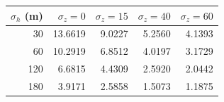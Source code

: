 \begin{tabular}{rrrrr}
\toprule
$\sigma_h$ (m) & $\sigma_z=0$ & $\sigma_z=15$ & $\sigma_z=40$ & $\sigma_z=60$ \\
\midrule
30 & 13.6619 & 9.0227 & 5.2560 & 4.1393 \\
60 & 10.2919 & 6.8512 & 4.0197 & 3.1729 \\
120 & 6.6815 & 4.4309 & 2.5920 & 2.0442 \\
180 & 3.9171 & 2.5858 & 1.5073 & 1.1875 \\
\bottomrule
\end{tabular}
